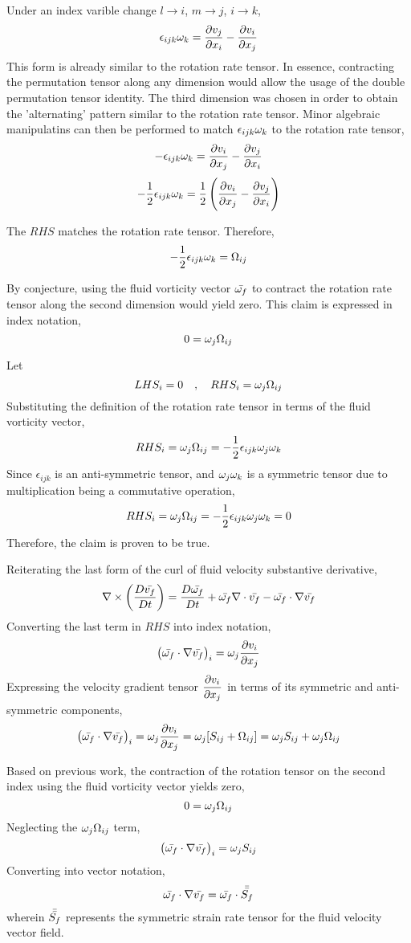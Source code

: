 \documentclass[class=report, 12pt, crop=false]{standalone}
\begin{document}
\begin{center}
Under an index varible change $l\to i$, $m\to j$, $i\to k$,
$$\epsilon_{ijk}\omega_k = \frac{\partial v_j}{\partial x_i} - \frac{\partial v_i}{\partial x_j}$$
This form is already similar to the rotation rate tensor. In essence, contracting the permutation tensor along any dimension would allow the usage of the double permutation tensor identity. The third dimension was chosen in order to obtain the 'alternating' pattern similar to the rotation rate tensor. Minor algebraic manipulatins can then be performed to match $\epsilon_{ijk}\omega_k$ to the rotation rate tensor,
$$-\epsilon_{ijk}\omega_k =  \frac{\partial v_i}{\partial x_j} - \frac{\partial v_j}{\partial x_i}$$
$$-\frac{1}{2}\epsilon_{ijk}\omega_k =  \frac{1}{2}\left(\frac{\partial v_i}{\partial x_j} - \frac{\partial v_j}{\partial x_i}\right)$$

The $RHS$ matches the rotation rate tensor. Therefore,
$$-\frac{1}{2}\epsilon_{ijk}\omega_k =  \Omega_{ij}$$

By conjecture, using the fluid vorticity vector $\bar{\omega_f}$ to contract the rotation rate tensor along the second dimension would yield zero. This claim is expressed in index notation,
$$0 = \omega_j\Omega_{ij}$$

Let 
$$LHS_i = 0 \quad,\quad RHS_i = \omega_j\Omega_{ij}$$
Substituting the definition of the rotation rate tensor in terms of the fluid vorticity vector,
$$RHS_i = \omega_j\Omega_{ij} = -\frac{1}{2}\epsilon_{ijk}\omega_j\omega_k$$
Since $\epsilon_{ijk}$ is an anti-symmetric tensor, and $\omega_j\omega_k$ is a symmetric tensor due to multiplication being a commutative operation,
$$RHS_i = \omega_j\Omega_{ij} = -\frac{1}{2}\epsilon_{ijk}\omega_j\omega_k = 0$$
Therefore, the claim is proven to be true.

Reiterating the last form of the curl of fluid velocity substantive derivative,
$$\nabla\times\left(\frac{D \bar{v_f}}{Dt}\right) = \frac{D \bar{\omega_f}}{Dt} + \bar{\omega_f}\nabla\cdot \bar{v_f} - \bar{\omega_f}\cdot\nabla \bar{v_f}$$
Converting the last term in $RHS$ into index notation,
$$\left(\bar{\omega_f}\cdot\nabla \bar{v_f}\right)_i = \omega_j\frac{\partial v_i}{\partial x_j}$$
Expressing the velocity gradient tensor $\displaystyle \frac{\partial v_i}{\partial x_j}$ in terms of its symmetric and anti-symmetric components,
$$\left(\bar{\omega_f}\cdot\nabla \bar{v_f}\right)_i = \omega_j\frac{\partial v_i}{\partial x_j} = \omega_j[S_{ij} + \Omega_{ij}] = \omega_jS_{ij} + \omega_j\Omega_{ij}$$

Based on previous work, the contraction of the rotation tensor on the second index using the fluid vorticity vector yields zero,
$$0 = \omega_j\Omega_{ij}$$
Neglecting the $\displaystyle \omega_j\Omega_{ij}$ term,
$$\left(\bar{\omega_f}\cdot\nabla \bar{v_f}\right)_i  = \omega_j S_{ij}$$
Converting into vector notation,
$$\bar{\omega_f}\cdot\nabla \bar{v_f}  = \bar{\omega_f} \cdot \bar{\bar{S_f}}$$
wherein $\bar{\bar{S_f}}$ represents the symmetric strain rate tensor for the fluid velocity vector field.


\end{center}
\end{document}
